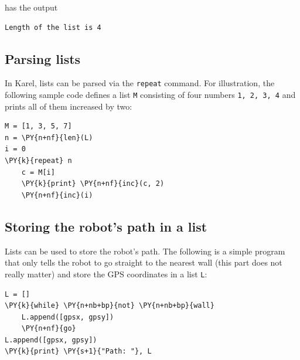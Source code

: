 \noindent
has the output\\

\begin{ybox}
\begin{Verbatim}[commandchars=\\\{\}]
Length of the list is 4
\end{Verbatim}
\end{ybox}
\vspace{6mm}

\subsection[\ \ Parsing lists]{Parsing lists}

In Karel, lists can be parsed via the {\tt repeat} command.
For illustration, the following sample code defines a list {\tt M} consisting of four numbers 
{\tt 1, 2, 3, 4} and prints all of them increased by two: \\

\begin{bbox}
\begin{Verbatim}[commandchars=\\\{\}]
M = [1, 3, 5, 7]
n = \PY{n+nf}{len}(L)
i = 0
\PY{k}{repeat} n
    c = M[i]
    \PY{k}{print} \PY{n+nf}{inc}(c, 2)
    \PY{n+nf}{inc}(i)
\end{Verbatim}
\end{bbox}
\vspace{6mm}

\subsection[\ \ Storing the robot's path in a list]{Storing the robot's path in a list}

\noindent
Lists can be used to store the robot's path. The following 
is a simple program that only tells the robot to go straight to the 
nearest wall (this part does not really matter) and store the GPS
coordinates in a list {\tt L}:\\

\begin{bbox}
\begin{Verbatim}[commandchars=\\\{\}]
L = []
\PY{k}{while} \PY{n+nb+bp}{not} \PY{n+nb+bp}{wall}
    L.append([gpsx, gpsy])
    \PY{n+nf}{go}
L.append([gpsx, gpsy])
\PY{k}{print} \PY{s+1}{"Path: "}, L
\end{Verbatim}
\end{bbox}
\vspace{6mm}

